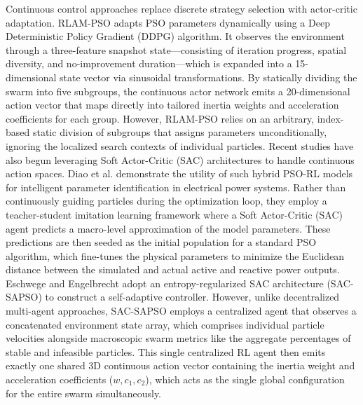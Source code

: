 \documentclass[final,5p,times]{elsarticle}
\begin{document}
Continuous control approaches replace discrete strategy selection with actor-critic adaptation.
RLAM-PSO \cite{Yin2023RLAMPSO} adapts PSO parameters dynamically using a Deep Deterministic Policy Gradient (DDPG) algorithm. 
It observes the environment through a three-feature snapshot state—consisting of iteration progress, spatial diversity, and no-improvement duration—which is expanded into a 15-dimensional state vector via sinusoidal transformations. 
By statically dividing the swarm into five subgroups, the continuous actor network emits a 20-dimensional action vector that maps directly into tailored inertia weights and acceleration coefficients for each group.
However, RLAM-PSO relies on an arbitrary, index-based static division of subgroups that assigns parameters unconditionally, ignoring the localized search contexts of individual particles.
Recent studies have also begun leveraging Soft Actor-Critic (SAC) architectures to handle continuous action spaces. Diao et al. \cite{Diao2024An} demonstrate the utility of such hybrid PSO-RL models for intelligent parameter identification in electrical power systems. 
Rather than continuously guiding particles during the optimization loop, they employ a teacher-student imitation learning framework where a Soft Actor-Critic (SAC) agent predicts a macro-level approximation of the model parameters. 
These predictions are then seeded as the initial population for a standard PSO algorithm, which fine-tunes the physical parameters to minimize the Euclidean distance between the simulated and actual active and reactive power outputs.
Eschwege and Engelbrecht \cite{vonEschwege2024Soft} adopt an entropy-regularized SAC architecture (SAC-SAPSO) to construct a self-adaptive controller. 
However, unlike decentralized multi-agent approaches, SAC-SAPSO employs a centralized agent that observes a concatenated environment state array, which comprises individual particle velocities alongside macroscopic swarm metrics like the aggregate percentages of stable and infeasible particles. 
This single centralized RL agent then emits exactly one shared 3D continuous action vector containing the inertia weight and acceleration coefficients ($w, c_1, c_2$), which acts as the single global configuration for the entire swarm simultaneously.
\end{document}
